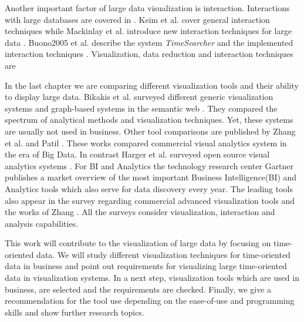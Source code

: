 Another important factor of large data visualization is interaction. Interactions with large databases are covered in  \cite{Buono2005, Jerding1998, Mackinlay1991, Keim2005}. Keim et al.  \cite{Keim2005} cover general interaction techniques while Mackinlay et al. introduce new interaction techniques for large data  \cite{Mackinlay1991}. Buono2005 et al. describe the system \textit{TimeSearcher} and the implemented interaction techniques  \cite{Buono2005}. Visualization, data reduction and interaction techniques are 
\par
In the last chapter we are comparing different visualization tools and their ability to display large data.  Bikakis et al. surveyed different generic visualization systems and graph-based systems in the semantic web  \cite{Bikakis2016}. They compared the spectrum of analytical methods and visualization techniques. Yet,  these systems are usually not used in business. 
Other tool comparisons are published by Zhang et al.  \cite{Zhang2012} and Patil  \cite{Patil}. These works compared commercial visual analytics system in the era of Big Data. In contrast Harger et al. surveyed open source visual analytics systems  \cite{Harger2012}. For BI and Analytics the technology research center Gartner publishes a market overview of the most important Business Intelligence(BI) and Analytics tools which also serve for data discovery every year. The leading tools also appear in the survey  \cite{Evelson2012} regarding commercial advanced visualization tools and the works of Zhang  \cite{Zhang2012}. All the surveys consider visualization,  interaction and analysis capabilities.  
\par
This work will contribute to the visualization of large data by focusing on time-oriented data. We will study different visualization techniques for time-oriented data in business and point out requirements for visualizing large time-oriented data in visualization systems. In a next step,  visualization tools which are used in business,  are selected and the requirements are checked. Finally,  we give a recommendation for the tool use depending on the ease-of-use and programming skills and show further research topics.






